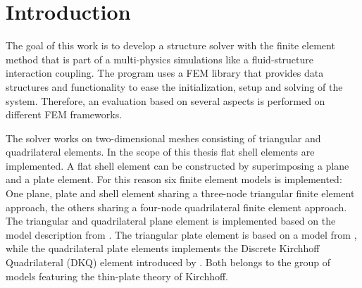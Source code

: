 \section{Introduction}




%
The goal of this work is to develop a structure solver with the finite element method that is part of a multi-physics simulations like a fluid-structure interaction coupling. The program uses a FEM library that provides data structures and functionality to ease the initialization, setup and solving of the system. Therefore, an evaluation based on several aspects is performed on different FEM frameworks.

The solver works on two-dimensional meshes consisting of triangular and quadrilateral elements. In the scope of this thesis flat shell elements are implemented. A flat shell element can be constructed by superimposing a plane and a plate element. For this reason six finite element models is implemented: One plane, plate and shell element sharing a three-node triangular finite element approach, the others sharing a four-node quadrilateral finite element approach. The triangular and quadrilateral plane element is implemented based on the model description from \cite{steinke2005finite}. The triangular plate element is based on a model from \cite{specht1988modified}, while the quadrilateral plate elements implements the Discrete Kirchhoff Quadrilateral (DKQ) element introduced by \cite{zienkiewicz2000finite}. Both belongs to the group of models featuring the thin-plate theory of Kirchhoff. 

